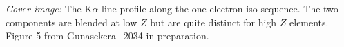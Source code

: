 \documentclass[12pt]{book}
\begin{document}
\clearpage

\vspace{5mm}
\noindent
{\small {\em Cover image:}
The K$\alpha$ line profile along the one-electron iso-sequence.
The two components are blended at low $Z$ but are quite distinct
for high $Z$ elements.
Figure 5 from Gunasekera+2034 in preparation.
}
\clearpage

\tableofcontents
\listoffigures
\listoftables

\clearpage
\mainmatter

\backmatter


\end{document}
